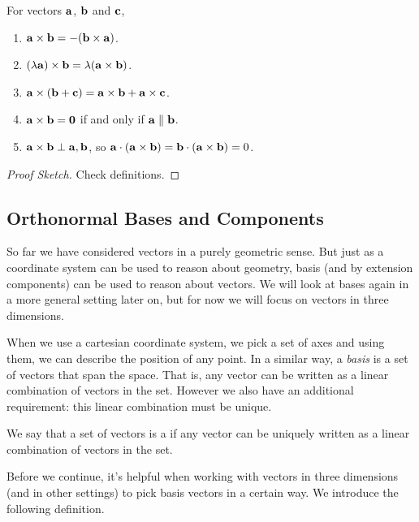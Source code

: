 \documentclass[a4paper]{scrartcl}
\begin{document}
\begin{proposition}
    For vectors $\mathbf{a}$, $\mathbf{b}$ and $\mathbf{c}$,
    \begin{enumerate}[label=(\roman*)]
        \item $\mathbf{a} \times \mathbf{b} = - (\mathbf{b} \times \mathbf{a})$.
        \item $(\lambda \mathbf{a}) \times \mathbf{b} = \lambda (\mathbf{a} \times \mathbf{b})$.
        \item $\mathbf{a} \times (\mathbf{b} + \mathbf{c}) = \mathbf{a} \times \mathbf{b} + \mathbf{a} \times \mathbf{c}$.
        \item $\mathbf{a} \times \mathbf{b} = \mathbf{0}$ if and only if $\mathbf{a} \parallel \mathbf{b}$.
        \item $\mathbf{a} \times \mathbf{b} \perp \mathbf{a}, \mathbf{b}$, so $\mathbf{a} \cdot (\mathbf{a} \times \mathbf{b}) = \mathbf{b} \cdot (\mathbf{a} \times \mathbf{b}) = 0$. 
    \end{enumerate}
\end{proposition}
\begin{proof}[Proof Sketch]
    Check definitions.
\end{proof}

\subsection{Orthonormal Bases and Components}

So far we have considered vectors in a purely geometric sense. But just as a coordinate system can be used to reason about geometry, basis (and by extension components) can be used to reason about vectors. We will look at bases again in a more general setting later on, but for now we will focus on vectors in three dimensions.

When we use a cartesian coordinate system, we pick a set of axes and using them, we can describe the position of any point. In a similar way, a \emph{basis} is a set of vectors that span the space. That is, any vector can be written as a linear combination of vectors in the set. However we also have an additional requirement: this linear combination must be unique.

\begin{definition}
    We say that a set of vectors is a  if any vector can be uniquely written as a linear combination of vectors in the set.
\end{definition}

Before we continue, it's helpful when working with vectors in three dimensions (and in other settings) to pick basis vectors in a certain way. We introduce the following definition.
\end{document}
